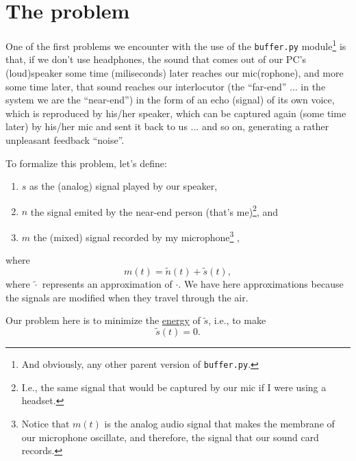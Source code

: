 \section{The problem}

One of the first problems we encounter with the use of the
\texttt{buffer.py} module\footnote{And obviously, any other parent
  version of \texttt{buffer.py}.} is that, if we don't use headphones,
the sound that comes out of our PC's (loud)speaker some time
(miliseconds) later reaches our mic(rophone), and more some time
later, that sound reaches our interlocutor (the ``far-end'' ... in the
system we are the ``near-end'') in the form of an echo (signal) of its
own voice, which is reproduced by his/her speaker, which can be
captured again (some time later) by his/her mic and sent it back to us
... and so on, generating a rather unpleasant feedback ``noise''.

To formalize this problem, let's define:
\begin{enumerate}
\item $s$ as the (analog) signal played by our
  speaker, %
\item $n$ the signal emited by
  the near-end person (that's me)\footnote{I.e.,
  the same signal that would be captured by our mic if I were using a
  headset.}, and %
\item $m$ the (mixed) signal recorded by my microphone\footnote{Notice
that $m(t)$ is the analog audio signal that makes the membrane of our
microphone oscillate, and therefore, the signal that our sound card
records.}  ,
\end{enumerate}
where
\begin{equation}
  m(t) = \tilde{n}(t) + \tilde{s}(t),
  \label{eq:echo_problem}
\end{equation}
where $\tilde{\cdot}$ represents an approximation of $\cdot$. We have
here approximations because the signals are modified when they travel
through the air.

Our problem here is to minimize the
\href{https://en.wikipedia.org/wiki/Energy_(signal_processing)}{energy}
of $\tilde{s}$, i.e., to make
\begin{equation}
  \tilde{s}(t) = 0.
\end{equation}

